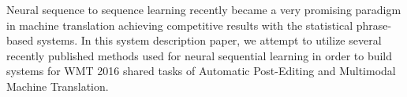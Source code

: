 Neural sequence to sequence learning recently became a very promising paradigm in machine translation achieving competitive results with the statistical phrase-based systems. In this system description paper, we attempt to utilize several recently published methods used for neural sequential learning in order to build systems for WMT 2016 shared tasks of Automatic Post-Editing and Multimodal Machine Translation.
